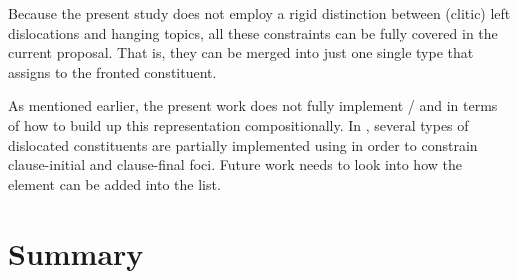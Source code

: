 Because the present study does not employ a rigid distinction between
(clitic) left dislocations and hanging topics, all these constraints
can be fully covered in the current proposal. That is,
they can be merged into just one single type that assigns
 to the fronted constituent. 





As mentioned earlier, the present work does not fully implement
/  and  in terms
of how to build up this representation compositionally. In
, several types of dislocated constituents are
partially implemented using  in order to
constrain clause-initial and clause-final foci. Future work needs to
look into how the  element can be added into the
 list.





\section{Summary}
\label{10-4:sec:summary}


